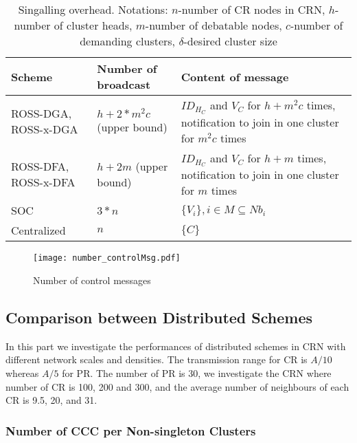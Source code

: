\begin{table}[hc]
\center
\begin{tabular}{|p{3 cm}|p{3 cm}|p{7.5 cm}|}
\hline
 Scheme 		&   Number of broadcast  	& Content of message \\ \hline
 ROSS-DGA, ROSS-x-DGA 		&   $h+2*m^2c$  (upper bound)				& $ID_{H_C}$ and $V_C$ for $h+m^2c$ times, notification to join in one cluster for $m^2c$ times					\\ \hline
 ROSS-DFA, ROSS-x-DFA 		&   $h+ 2m$	 (upper bound)				& $ID_{H_C}$ and $V_C$ for $h+m$ times, notification to join in one cluster for $m$ times	 					\\ \hline
 SOC 			&   $3*n$					& $\{V_i\}, i\in M\subseteq Nb_i$						\\ \hline
 Centralized	&	$n$						& $\{C\}$         	\\ \hline
\end{tabular}
\caption{Singalling overhead. Notations: $n$-number of CR nodes in CRN, $h$-number of cluster heads, $m$-number of debatable nodes, $c$-number of demanding clusters, $\delta$-desired cluster size}
\label{tab_overhead}
\end{table}


\begin{figure}[ht!]
  \centering
  \texttt{[image: number\_controlMsg.pdf]}
  \caption{Number of control messages}
  \label{control_msg}
\end{figure}


\subsection{Comparison between Distributed Schemes}
In this part we investigate the performances of distributed schemes in CRN with different network scales and densities.
The transmission range for CR is $A/10$ whereas $A/5$ for PR.
The number of PR is 30, we investigate the CRN where number of CR is 100, 200 and 300, and the average number of neighbours of each CR is 9.5, 20, and 31.


\subsubsection{Number of CCC per Non-singleton Clusters}

